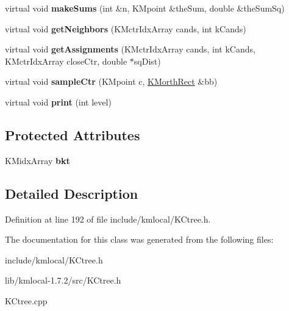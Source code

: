 \begin{DoxyCompactItemize}
\item 
\hypertarget{class_k_cleaf_a7dcd82054b44f7457741b418ae13d801}{
virtual void {\bfseries makeSums} (int \&n, KMpoint \&theSum, double \&theSumSq)}
\label{class_k_cleaf_a7dcd82054b44f7457741b418ae13d801}

\item 
\hypertarget{class_k_cleaf_a3b9ff9fcd0e06199ecadde4980e12e2d}{
virtual void {\bfseries getNeighbors} (KMctrIdxArray cands, int kCands)}
\label{class_k_cleaf_a3b9ff9fcd0e06199ecadde4980e12e2d}

\item 
\hypertarget{class_k_cleaf_a947f8e3cede6eb914515ed994281f271}{
virtual void {\bfseries getAssignments} (KMctrIdxArray cands, int kCands, KMctrIdxArray closeCtr, double $\ast$sqDist)}
\label{class_k_cleaf_a947f8e3cede6eb914515ed994281f271}

\item 
\hypertarget{class_k_cleaf_a66489cca5c55f77b9191e283c51a0c6c}{
virtual void {\bfseries sampleCtr} (KMpoint c, \hyperlink{class_k_morth_rect}{KMorthRect} \&bb)}
\label{class_k_cleaf_a66489cca5c55f77b9191e283c51a0c6c}

\item 
\hypertarget{class_k_cleaf_a9b7b9e253bd1c8da311be7333d33617c}{
virtual void {\bfseries print} (int level)}
\label{class_k_cleaf_a9b7b9e253bd1c8da311be7333d33617c}

\end{DoxyCompactItemize}
\subsection*{Protected Attributes}
\begin{DoxyCompactItemize}
\item 
\hypertarget{class_k_cleaf_adfaafd4e7101350d31c92ba4ba2298bd}{
KMidxArray {\bfseries bkt}}
\label{class_k_cleaf_adfaafd4e7101350d31c92ba4ba2298bd}

\end{DoxyCompactItemize}


\subsection{Detailed Description}


Definition at line 192 of file include/kmlocal/KCtree.h.



The documentation for this class was generated from the following files:\begin{DoxyCompactItemize}
\item 
include/kmlocal/KCtree.h\item 
lib/kmlocal-\/1.7.2/src/KCtree.h\item 
KCtree.cpp\end{DoxyCompactItemize}
